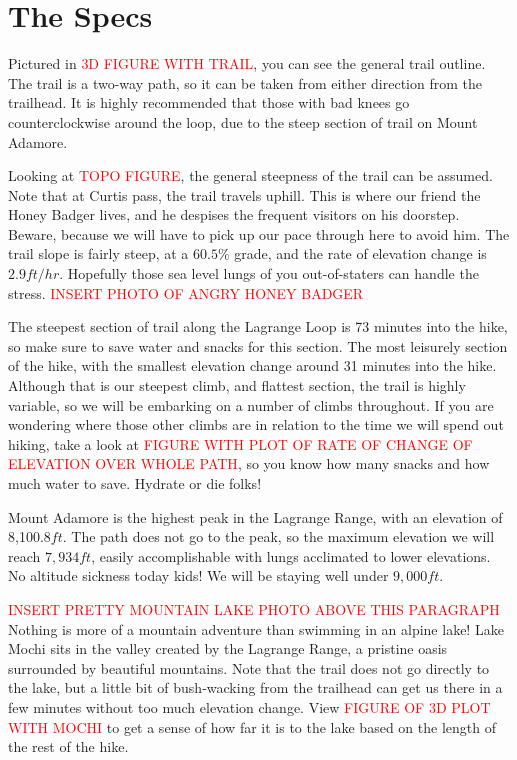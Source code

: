 \documentclass[12pt]{article}   %
\theoremstyle{definition}
\numberwithin{equation}{section}
\begin{document}
\section{The Specs}
\label{APPM2350proj01sec03}

\quad Pictured in \textcolor{red}{3D FIGURE WITH TRAIL}, you can see the general trail outline. The trail is a two-way path, so it can be taken from either direction from the trailhead. It is highly recommended that those with bad knees go counterclockwise around the loop, due to the steep section of trail on Mount Adamore.

\quad Looking at \textcolor{red}{TOPO FIGURE}, the general steepness of the trail can be assumed. Note that at Curtis pass, the trail travels uphill. This is where our friend the Honey Badger lives, and he despises the frequent visitors on his doorstep. Beware, because we will have to pick up our pace through here to avoid him. The trail slope is fairly steep, at a $60.5\%$ grade, and the rate of elevation change is $2.9ft/hr$. Hopefully those sea level lungs of you out-of-staters can handle the stress.
\textcolor{red}{INSERT PHOTO OF ANGRY HONEY BADGER}

\quad The steepest section of trail along the Lagrange Loop is 73 minutes into the hike, so make sure to save water and snacks for this section. The most leisurely section of the hike, with the smallest elevation change around 31 minutes into the hike.
\quad Although that is our steepest climb, and flattest section, the trail is highly variable, so we will be embarking on a number of climbs throughout. If you are wondering where those other climbs are in relation to the time we will spend out hiking, take a look at \textcolor{red}{FIGURE WITH PLOT OF RATE OF CHANGE OF ELEVATION OVER WHOLE PATH}, so you know how many snacks and how much water to save. Hydrate or die folks!

\quad Mount Adamore is the highest peak in the Lagrange Range, with an elevation of 8,100.8$ft$. The path does not go to the peak, so the maximum elevation we will reach $7,934ft$, easily accomplishable with lungs acclimated to lower elevations. No altitude sickness today kids! We will be staying well under $9,000ft$.

\quad \textcolor{red}{INSERT PRETTY MOUNTAIN LAKE PHOTO ABOVE THIS PARAGRAPH} Nothing is more of a mountain adventure than swimming in an alpine lake! Lake Mochi sits in the valley created by the Lagrange Range, a pristine oasis surrounded by beautiful mountains. Note that the trail does not go directly to the lake, but a little bit of bush-wacking from the trailhead can get us there in a few minutes without too much elevation change. View \textcolor{red}{FIGURE OF 3D PLOT WITH MOCHI} to get a sense of how far it is to the lake based on the length of the rest of the hike.
\end{document}
